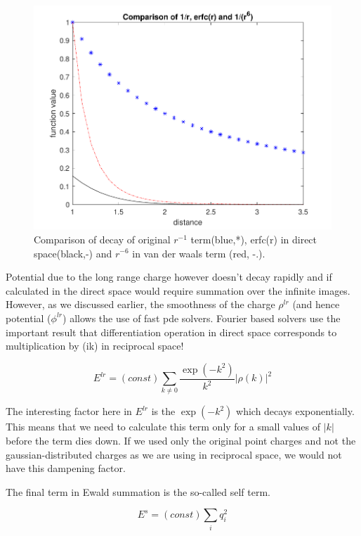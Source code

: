 \documentclass[9pt,bestpractices]{livecoms}
\begin{document}
\begin{figure}[h]
\centering
\includegraphics[width=\linewidth]{decay_comparison.pdf}
    \caption{Comparison of decay of original $r^{-1}$ term(blue,*), erfc(r) in direct space(black,-) and $r^{-6}$ in van der waals term (red, -.).  }
\label{charges_ewald}
\end{figure}


Potential due to the long range charge however doesn't decay rapidly and if calculated in the direct space would require summation over the infinite images. However, as we discussed earlier, the smoothness of the  charge $\rho^{lr}$ (and hence potential ($\phi^{lr}$) allows the use of fast pde solvers. Fourier based solvers use the important result that differentiation operation in direct space corresponds to multiplication by (ik) in reciprocal space!


\[
E^{lr} = (const) \sum_{k \neq 0} \frac{\exp(-k^2)}{k^2}  |\rho(k)|^2
\]

The interesting factor here in $E^{lr}$ is the $\exp (-k^2)$ which decays exponentially. This means that we need to calculate this term only for a small values of $|k|$ before the term dies down. If we used only the original point charges and not the gaussian-distributed charges as we are using in reciprocal space, we would not have this dampening factor. 

The final term in Ewald summation is the so-called self term. 

\[
E^{s} = (const)\sum_i q_i^2
\]
\end{document}
